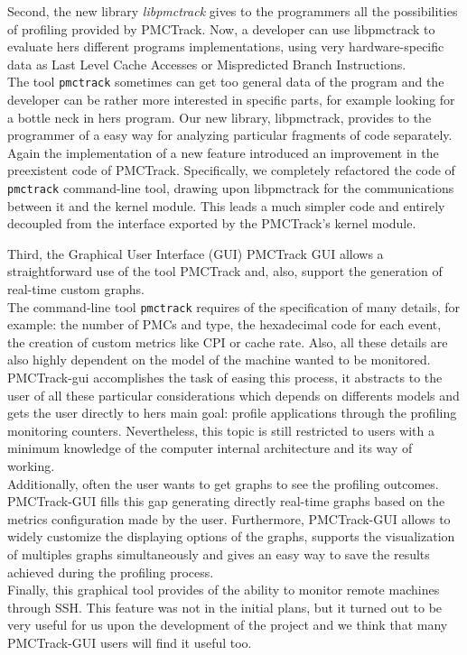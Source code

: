 Second, the new library \textit{libpmctrack} gives to the programmers all the possibilities of profiling provided by PMCTrack. Now, a developer can use libpmctrack to evaluate hers different programs implementations, using very hardware-specific data as Last Level Cache Accesses or Mispredicted Branch Instructions.\\%
The tool \texttt{pmctrack} sometimes can get too general data of the program and the developer can be rather more interested in specific parts, for example looking for a bottle neck in hers program. Our new library, libpmctrack, provides to the programmer of a easy way for analyzing particular fragments of code separately.\\%
Again the implementation of a new feature introduced an improvement in the preexistent code of PMCTrack. Specifically, we completely refactored the code of \texttt{pmctrack} command-line tool, drawing upon libpmctrack for the communications between it and the kernel module. This leads a much simpler code and entirely decoupled from the interface exported by the PMCTrack's kernel module.

Third, the Graphical User Interface (GUI) PMCTrack GUI allows a straightforward use of the tool PMCTrack and, also, support the generation of real-time custom graphs.\\
The command-line tool \texttt{pmctrack} requires of the specification of many details, for example: the number of PMCs and type, the hexadecimal code for each event, the creation of custom metrics like CPI or cache rate. Also, all these details are also highly dependent on the model of the machine wanted to be monitored. PMCTrack-gui accomplishes the task of easing this process, it abstracts to the user of all these particular considerations which depends on differents models and gets the user directly to hers main goal: profile applications through the profiling monitoring counters. Nevertheless, this topic is still restricted to users with a minimum knowledge of the computer internal architecture and its way of working.\\
Additionally, often the user wants to get graphs to see the profiling outcomes. PMCTrack-GUI fills this gap generating directly real-time graphs based on the metrics configuration made by the user. Furthermore, PMCTrack-GUI allows to widely customize the displaying options of the graphs, supports the visualization of multiples graphs simultaneously and gives an easy way to save the results achieved during the profiling process.\\
Finally, this graphical tool provides of the ability to monitor remote machines through SSH. This feature was not in the initial plans, but it turned out to be very useful for us upon the development of the project and we think that many PMCTrack-GUI users will find it useful too.

